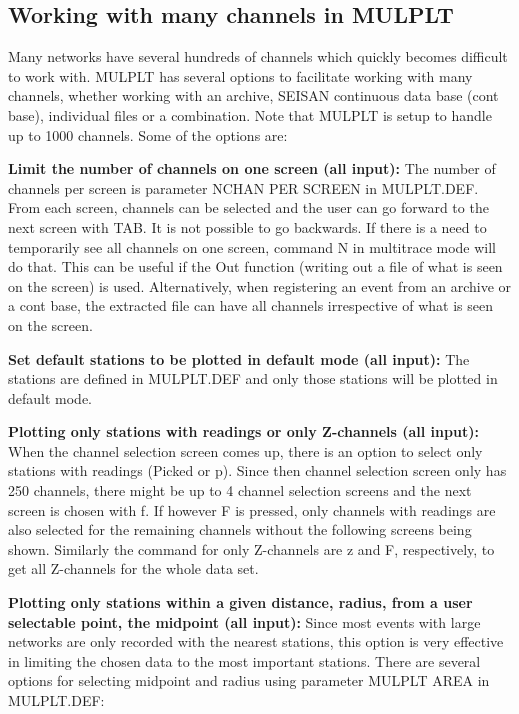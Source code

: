 %
\subsection{Working with many channels in MULPLT}

Many networks have several hundreds of channels which quickly becomes difficult to work with. MULPLT has several options to facilitate working with many channels, whether working with an archive, SEISAN continuous data base (cont base), individual files or a combination. Note that MULPLT is setup to handle up to 1000 channels.  Some of the options are:

\textbf{Limit the number of channels on one screen (all input):} The number of channels per screen is parameter NCHAN PER SCREEN in MULPLT.DEF. From each screen, channels can be selected and the user can go forward to the next screen with TAB. It is not possible to go backwards. If there is a need to temporarily see all channels on one screen, command N in multitrace mode will do that. This can be useful if the Out function (writing out a file of what is seen on the screen) is used. Alternatively, when registering an event from an archive or a cont base, the extracted file can have all channels irrespective of what is seen on the screen.

\textbf{Set default stations to be plotted in default mode (all input):} The stations are defined in MULPLT.DEF and only those stations will be plotted in default mode.

\textbf{Plotting only stations with readings or only Z-channels (all input):} When the channel selection screen comes up, there is an option to select only stations with readings (Picked or p). Since then channel selection screen only has 250 channels, there might be up to 4 channel selection screens and the next screen is chosen with f. If however F is pressed, only channels with readings are also selected for the remaining channels without the following screens being shown. Similarly the command for only Z-channels are z and F, respectively, to get all Z-channels for the whole data set.

\textbf{Plotting only stations within a given distance, radius, from a user selectable point, the midpoint (all input):} Since most events with large networks are only recorded with the nearest stations, this option is very effective in limiting the chosen data to the most important stations. There are several options for selecting midpoint and radius using parameter MULPLT AREA in MULPLT.DEF:
  
